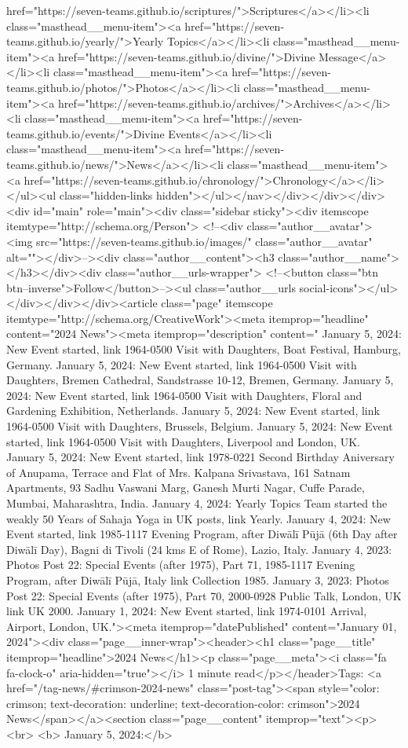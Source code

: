 href="https://seven-teams.github.io/scriptures/">Scriptures</a></li><li class="masthead__menu-item"><a href="https://seven-teams.github.io/yearly/">Yearly Topics</a></li><li class="masthead__menu-item"><a href="https://seven-teams.github.io/divine/">Divine Message</a></li><li class="masthead__menu-item"><a href="https://seven-teams.github.io/photos/">Photos</a></li><li class="masthead__menu-item"><a href="https://seven-teams.github.io/archives/">Archives</a></li><li class="masthead__menu-item"><a href="https://seven-teams.github.io/events/">Divine Events</a></li><li class="masthead__menu-item"><a href="https://seven-teams.github.io/news/">News</a></li><li class="masthead__menu-item"><a href="https://seven-teams.github.io/chronology/">Chronology</a></li></ul><ul class="hidden-links hidden"></ul></nav></div></div></div><div id="main" role="main"><div class="sidebar sticky"><div itemscope itemtype="http://schema.org/Person"> <!--<div class="author__avatar"> <img src="https://seven-teams.github.io/images/" class="author__avatar" alt=""></div>--><div class="author__content"><h3 class="author__name"></h3></div><div class="author__urls-wrapper"> <!--<button class="btn btn--inverse">Follow</button>--><ul class="author__urls social-icons"></ul></div></div></div><article class="page" itemscope itemtype="http://schema.org/CreativeWork"><meta itemprop="headline" content="2024 News"><meta itemprop="description" content=" January 5, 2024: New Event started, link 1964-0500 Visit with Daughters, Boat Festival, Hamburg, Germany. January 5, 2024: New Event started, link 1964-0500 Visit with Daughters, Bremen Cathedral, Sandstrasse 10-12, Bremen, Germany. January 5, 2024: New Event started, link 1964-0500 Visit with Daughters, Floral and Gardening Exhibition, Netherlands. January 5, 2024: New Event started, link 1964-0500 Visit with Daughters, Brussels, Belgium. January 5, 2024: New Event started, link 1964-0500 Visit with Daughters, Liverpool and London, UK. January 5, 2024: New Event started, link 1978-0221 Second Birthday Aniversary of Anupama, Terrace and Flat of Mrs. Kalpana Srivastava, 161 Satnam Apartments, 93 Sadhu Vaswani Marg, Ganesh Murti Nagar, Cuffe Parade, Mumbai, Maharashtra, India. January 4, 2024: Yearly Topics Team started the weakly 50 Years of Sahaja Yoga in UK posts, link Yearly. January 4, 2024: New Event started, link 1985-1117 Evening Program, after Diwālī Pūjā (6th Day after Diwālī Day), Bagni di Tivoli (24 kms E of Rome), Lazio, Italy. January 4, 2023: Photos Post 22: Special Events (after 1975), Part 71, 1985-1117 Evening Program, after Diwālī Pūjā, Italy link Collection 1985. January 3, 2023: Photos Post 22: Special Events (after 1975), Part 70, 2000-0928 Public Talk, London, UK link UK 2000. January 1, 2024: New Event started, link 1974-0101 Arrival, Airport, London, UK."><meta itemprop="datePublished" content="January 01, 2024"><div class="page__inner-wrap"><header><h1 class="page__title" itemprop="headline">2024 News</h1><p class="page__meta"><i class="fa fa-clock-o" aria-hidden="true"></i> 1 minute read</p></header>Tags: <a href="/tag-news/#crimson-2024-news" class="post-tag"><span style="color: crimson; text-decoration: underline; text-decoration-color: crimson">2024 News</span></a><section class="page__content" itemprop="text"><p> <br> <b> January 5, 2024:</b> 